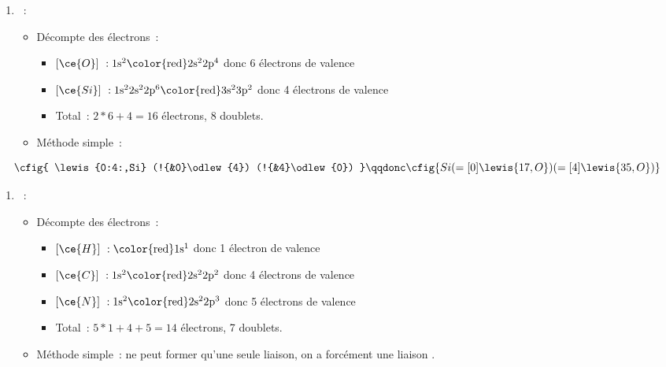 \documentclass[a4paper, 12pt, final, garamond]{book}
\begin{document}
\begin{enumerate}
    \item[]
        \begin{itemize}[label=$\diamond$, leftmargin=10pt]
            ~:
                \begin{itemize}[label=$\triangleright$, leftmargin=20pt]
                    \item Décompte des électrons~:
                        \begin{itemize}[label=$\ra$, leftmargin=20pt]
                            \item $[\ce{O}]~: \rm 1s^2\color{red}2s^22p^4$
                                donc 6 électrons de valence
                            \item $[\ce{Si}]~: \rm 1s^22s^22p^6\color{red}3s^23p^2$
                                donc 4 électrons de valence
                            \item Total~: $2*6 + 4 = 16$ électrons, 8
                                doublets.
                        \end{itemize}
                    \item Méthode simple~:
                \end{itemize}
        \end{itemize}
\end{enumerate}
\smallbreak
\[
    \cfig{
        \lewis{0:4:,Si}
        (!{&0}\odlew{4})
        (!{&4}\odlew{0})
    }
    \qqdonc
    \cfig{
        Si
        (=[0]\lewis{17,O})
        (=[4]\lewis{35,O})
    }
\]
\begin{enumerate}
    \item[]
        \begin{itemize}[label=$\diamond$, leftmargin=10pt]
            ~:
                \begin{itemize}[label=$\triangleright$, leftmargin=20pt]
                    \item Décompte des électrons~:
                        \begin{itemize}[label=$\ra$, leftmargin=20pt]
                            \item $[\ce{H}]~: \rm \color{red}1s^1$
                                donc 1 électron de valence
                            \item $[\ce{C}]~: \rm 1s^2\color{red}2s^22p^2$
                                donc 4 électrons de valence
                            \item $[\ce{N}]~: \rm 1s^2\color{red}2s^22p^3$ donc
                                5 électrons de valence
                            \item Total~: $5*1 + 4 + 5 = 14$ électrons, 7
                                doublets.
                        \end{itemize}
                    \item Méthode simple~:  ne peut former qu'une seule
                        liaison, on a forcément une liaison .
                \end{itemize}
        \end{itemize}
\end{enumerate}
\end{document}
